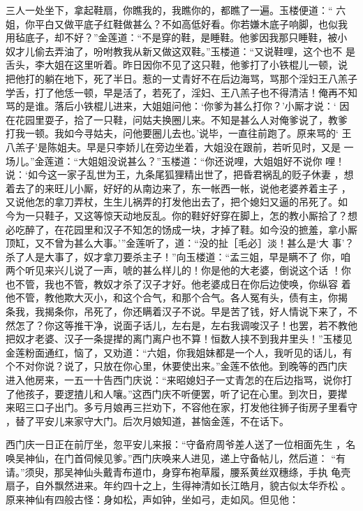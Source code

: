 三人一处坐下，拿起鞋扇，你瞧我的，我瞧你的，都瞧了一遍。玉楼便道：“
六姐，你平白又做平底子红鞋做甚么？不如高低好看。你若嫌木底子响脚，也似我
用毡底子，却不好？”金莲道：“不是穿的鞋，是睡鞋。他爹因我那只睡鞋，被小
奴才儿偷去弄油了，吩咐教我从新又做这双鞋。”玉楼道：“又说鞋哩，这个也不
是舌头，李大姐在这里听着。昨日因你不见了这只鞋，他爹打了小铁棍儿一顿，说
把他打的躺在地下，死了半日。惹的一丈青好不在后边海骂，骂那个淫妇王八羔子
学舌，打了他恁一顿，早是活了，若死了，淫妇、王八羔子也不得清洁！俺再不知
骂的是谁。落后小铁棍儿进来，大姐姐问他：‘你爹为甚么打你？’小厮才说：‘
因在花园里耍子，拾了一只鞋，问姑夫换圈儿来。不知是甚么人对俺爹说了，教爹
打我一顿。我如今寻姑夫，问他要圈儿去也。’说毕，一直往前跑了。原来骂的‘
王八羔子’是陈姐夫。早是只李娇儿在旁边坐着，大姐没在跟前，若听见时，又是
一场儿。”金莲道：“大姐姐没说甚么？”玉楼道：“你还说哩，大姐姐好不说你
哩！说：‘如今这一家子乱世为王，九条尾狐狸精出世了，把昏君祸乱的贬子休妻
，想着去了的来旺儿小厮，好好的从南边来了，东一帐西一帐，说他老婆养着主子
，又说他怎的拿刀弄杖，生生儿祸弄的打发他出去了，把个媳妇又逼的吊死了。如
今为一只鞋子，又这等惊天动地反乱。你的鞋好好穿在脚上，怎的教小厮拾了？想
必吃醉了，在花园里和汉子不知怎的饧成一块，才掉了鞋。如今没的摭羞，拿小厮
顶缸，又不曾为甚么大事。’”金莲听了，道：“没的扯［毛必］淡！甚么是‘大
事’？杀了人是大事了，奴才拿刀要杀主子！”向玉楼道：“孟三姐，早是瞒不了
你，咱两个听见来兴儿说了一声，唬的甚么样儿的！你是他的大老婆，倒说这个话
！你也不管，我也不管，教奴才杀了汉子才好。他老婆成日在你后边使唤，你纵容
着他不管，教他欺大灭小，和这个合气，和那个合气。各人冤有头，债有主，你揭
条我，我揭条你，吊死了，你还瞒着汉子不说。早是苦了钱，好人情说下来了，不
然怎了？你这等推干净，说面子话儿，左右是，左右我调唆汉子！也罢，若不教他
把奴才老婆、汉子一条提撵的离门离户也不算！恒数人挟不到我井里头！”玉楼见
金莲粉面通红，恼了，又劝道：“六姐，你我姐妹都是一个人，我听见的话儿，有
个不对你说？说了，只放在你心里，休要使出来。”金莲不依他。到晚等的西门庆
进入他房来，一五一十告西门庆说：“来昭媳妇子一丈青怎的在后边指骂，说你打
了他孩子，要逻揸儿和人嚷。”这西门庆不听便罢，听了记在心里。到次日，要撵
来昭三口子出门。多亏月娘再三拦劝下，不容他在家，打发他往狮子街房子里看守
，替了平安儿来家守大门。后次月娘知道，甚恼金莲，不在话下。

西门庆一日正在前厅坐，忽平安儿来报：“守备府周爷差人送了一位相面先生
，名唤吴神仙，在门首伺候见爹。”西门庆唤来人进见，递上守备帖儿，然后道：
“有请。”须臾，那吴神仙头戴青布道巾，身穿布袍草履，腰系黄丝双穗绦，手执
龟壳扇子，自外飘然进来。年约四十之上，生得神清如长江皓月，貌古似太华乔松
。原来神仙有四般古怪：身如松，声如钟，坐如弓，走如风。但见他：

